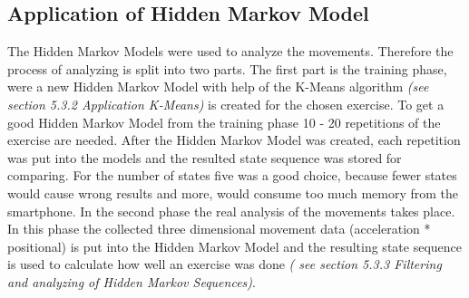 \subsection{Application of Hidden Markov Model}
The Hidden Markov Models were used to analyze the movements. Therefore the process of analyzing is split into two parts. The first part is the training phase, were a new Hidden Markov Model with help of the K-Means algorithm \textit{\small(see section 5.3.2 Application K-Means)} is created for the chosen exercise. To get a good Hidden Markov Model from the training phase 10 - 20 repetitions of the exercise are needed. After the Hidden Markov Model was created, each repetition was put into the models and the resulted state sequence was stored for comparing. For the number of states five was a good choice, because fewer states would cause wrong results and more, would consume too much memory from the smartphone. In the second phase the real analysis of the movements takes place. In this phase the collected three dimensional movement data (acceleration * positional) is put into the Hidden Markov Model and the resulting state sequence is used to calculate how well an exercise was done \textit{\small(  see section 5.3.3 Filtering and analyzing of Hidden Markov Sequences)}.